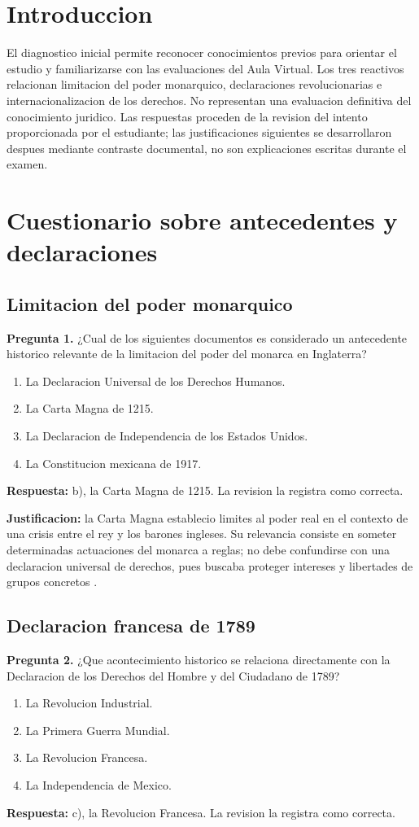 \documentclass[spanish,letterpaper,oneside]{article}
\begin{document}
\templatePortrait
\templatePagecfg
\templateFinalcfg
\onehalfspacing
\section{Introduccion}
El diagnostico inicial permite reconocer conocimientos previos para
orientar el estudio y familiarizarse con las evaluaciones del Aula
Virtual. Los tres reactivos relacionan limitacion del poder monarquico,
declaraciones revolucionarias e internacionalizacion de los derechos.
No representan una evaluacion definitiva del conocimiento juridico.
Las respuestas proceden de la revision del intento proporcionada por
el estudiante; las justificaciones siguientes se desarrollaron despues
mediante contraste documental, no son explicaciones escritas durante
el examen.

\section{Cuestionario sobre antecedentes y declaraciones}
\subsection{Limitacion del poder monarquico}
\textbf{Pregunta 1.} ¿Cual de los siguientes documentos es considerado
un antecedente historico relevante de la limitacion del poder del
monarca en Inglaterra?
\begin{enumerate}
\item[a)] La Declaracion Universal de los Derechos Humanos.
\item[b)] La Carta Magna de 1215.
\item[c)] La Declaracion de Independencia de los Estados Unidos.
\item[d)] La Constitucion mexicana de 1917.
\end{enumerate}
\textbf{Respuesta:} b), la Carta Magna de 1215. La revision la registra
como correcta.

\textbf{Justificacion:} la Carta Magna establecio limites al poder
real en el contexto de una crisis entre el rey y los barones ingleses.
Su relevancia consiste en someter determinadas actuaciones del monarca
a reglas; no debe confundirse con una declaracion universal de derechos,
pues buscaba proteger intereses y libertades de grupos concretos
\citep{parlamentoCarta1215ADH}.

\subsection{Declaracion francesa de 1789}
\textbf{Pregunta 2.} ¿Que acontecimiento historico se relaciona
directamente con la Declaracion de los Derechos del Hombre y del
Ciudadano de 1789?
\begin{enumerate}
\item[a)] La Revolucion Industrial.
\item[b)] La Primera Guerra Mundial.
\item[c)] La Revolucion Francesa.
\item[d)] La Independencia de Mexico.
\end{enumerate}
\textbf{Respuesta:} c), la Revolucion Francesa. La revision la registra
como correcta.
\end{document}
